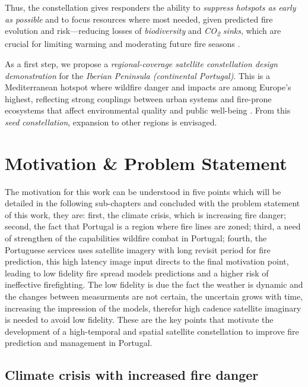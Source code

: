 Thus, the constellation gives responders the ability to \emph{suppress
	hotspots as early as possible} and to focus resources where most needed,
given predicted fire evolution and risk---reducing losses of
\emph{biodiversity} and \emph{CO\textsubscript{2} sinks}, which are crucial for
limiting warming and moderating future fire seasons \cite{kelly2020fire}.

As a first step, we propose a \emph{regional-coverage satellite
	constellation design demonstration} for the \emph{Iberian Peninsula
	(continental Portugal)}. This is a Mediterranean hotspot where wildfire danger
and impacts are among Europe's highest, reflecting strong couplings
between urban systems and fire-prone ecosystems that affect
environmental quality and public well-being \cite{sanmiguel2018fires,costa2020wildfire,turco2019drivers}. From
this \emph{seed constellation}, expansion to other regions is
envisaged.

\section{Motivation \& Problem Statement}\label{sec:motivation}

The motivation for this work can be understood in five points which will be detailed in the following sub-chapters and concluded with the problem statement of this work, they are: first, the climate crisis, which is increasing fire danger; second, the fact that Portugal is a region where fire lines are zoned; third, a need of strengthen of the capabilities wildfire combat in Portugal; fourth, the Portuguese services uses satellite imagery with long revisit period for fire prediction, this high latency image input  directs to the final motivation point,  leading to low fidelity fire spread models predictions and a higher risk of ineffective firefighting. The low fidelity is due the fact the weather is dynamic and the changes between measurments are not certain, the uncertain grows with time, increasing the impression of the models, therefor high cadence satellite imaginary is needed to avoid low fidelity.  These are the key points that motivate the development of a high-temporal and spatial satellite constellation to improve fire prediction and management in Portugal. 

\subsection{Climate crisis with increased fire danger} 

